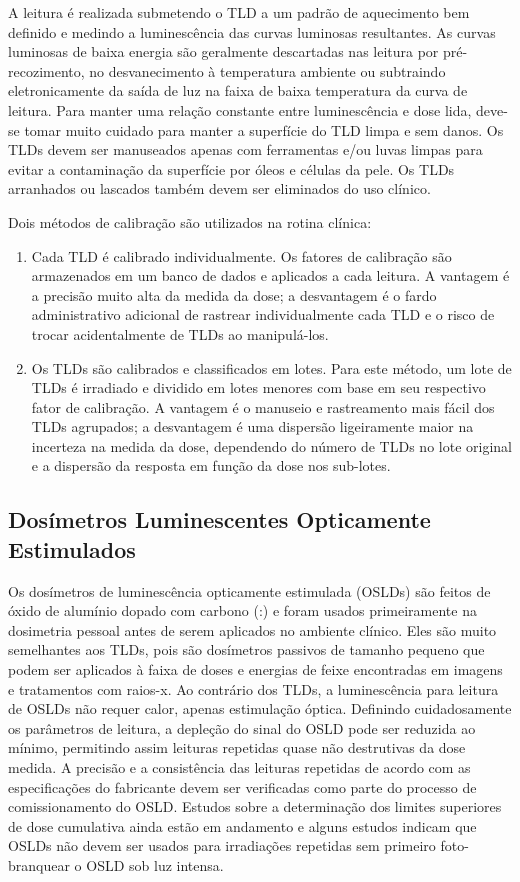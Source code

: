 \documentclass[11pt,a4paper]{article}
\begin{document}
	A leitura é realizada submetendo o TLD a um padrão de aquecimento bem definido e medindo a luminescência das curvas luminosas resultantes. As curvas luminosas de baixa energia são geralmente descartadas nas leitura por pré-recozimento, no desvanecimento à temperatura ambiente ou subtraindo eletronicamente da saída de luz na faixa de baixa temperatura da curva de leitura. Para manter uma relação constante entre luminescência e dose lida, deve-se tomar muito cuidado para manter a superfície do TLD limpa e sem danos. Os TLDs devem ser manuseados apenas com ferramentas e/ou luvas limpas para evitar a contaminação da superfície por óleos e células da pele. Os TLDs arranhados ou lascados também devem ser eliminados do uso clínico.

	Dois métodos de calibração são utilizados na rotina clínica:

	\begin{enumerate}
		\item Cada TLD é calibrado individualmente. Os fatores de calibração são armazenados em um banco de dados e aplicados a cada leitura. A vantagem é a precisão muito alta da medida da dose; a desvantagem é o fardo administrativo adicional de rastrear individualmente cada TLD e o risco de trocar acidentalmente de TLDs ao manipulá-los.
		
		\item Os TLDs são calibrados e classificados em lotes. Para este método, um lote de TLDs é irradiado e dividido em lotes menores com base em seu respectivo fator de calibração. A vantagem é o manuseio e rastreamento mais fácil dos TLDs agrupados; a desvantagem é uma dispersão ligeiramente maior na incerteza na medida da dose, dependendo do número de TLDs no lote original e a dispersão da resposta em função da dose nos sub-lotes.
	\end{enumerate}

\subsection*{Dosímetros Luminescentes Opticamente Estimulados}

	Os dosímetros de luminescência opticamente estimulada (OSLDs) são feitos de óxido de alumínio dopado com carbono (:) e foram usados primeiramente na dosimetria pessoal antes de serem aplicados no ambiente clínico. Eles são muito semelhantes aos TLDs, pois são dosímetros passivos de tamanho pequeno que podem ser aplicados à faixa de doses e energias de feixe encontradas em imagens e tratamentos com raios-x. Ao contrário dos TLDs, a luminescência para leitura de OSLDs não requer calor, apenas estimulação óptica. Definindo cuidadosamente os parâmetros de leitura, a depleção do sinal do OSLD pode ser reduzida ao mínimo, permitindo assim leituras repetidas quase não destrutivas da dose medida. A precisão e a consistência das leituras repetidas de acordo com as especificações do fabricante devem ser verificadas como parte do processo de comissionamento do OSLD. Estudos sobre a determinação dos limites superiores de dose cumulativa ainda estão em andamento e alguns estudos indicam que OSLDs não devem ser usados para irradiações repetidas sem primeiro foto-branquear o OSLD sob luz intensa.
\end{document}
